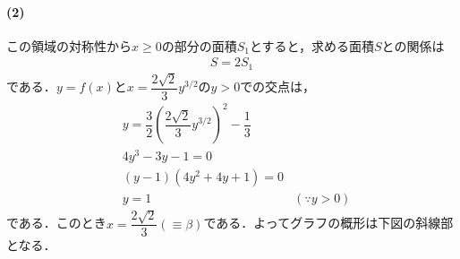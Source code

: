 \documentclass[../../main.tex]{subfiles}
\begin{document}
\paragraph{(2)}
この領域の対称性から$x\ge0$の部分の面積$S_1$とすると，求める面積$S$との関係は
\begin{align}
  S=2S_1 \label{eq:7}
\end{align}
である．$y=f(x)$と$x=\dfrac{2\sqrt{2}}{3}y^{3/2}$の$y>0$での交点は，
\begin{align}
  &y=\dfrac{3}{2}\left(\dfrac{2\sqrt{2}}{3}y^{3/2}\right)^2-\dfrac{1}{3} \\
  &4y^3-3y-1=0 \\
  &(y-1)(4y^2+4y+1)=0 \\
  &y=1&(\because y>0)
\end{align}
である．このとき$x=\dfrac{2\sqrt{2}}{3}(\equiv \beta)$である．よってグラフの概形は下図の斜線部となる．
\end{document}
